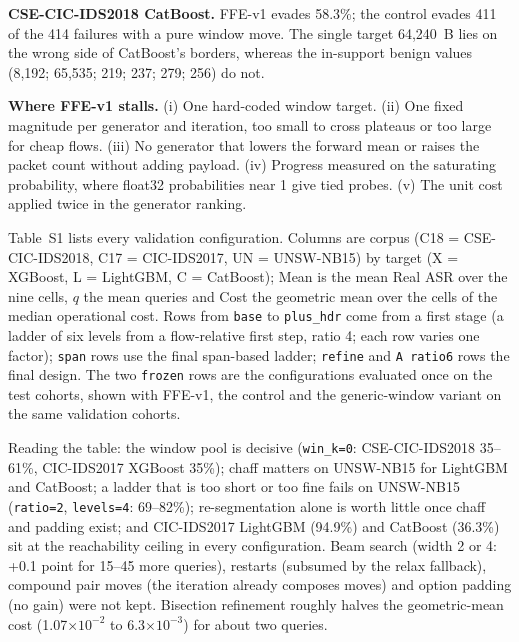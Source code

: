 \textbf{CSE-CIC-IDS2018 CatBoost.} FFE-v1 evades 58.3\%; the control evades 411 of the 414 failures with a pure window move. The single target 64,240~B lies on the wrong side of CatBoost's borders, whereas the in-support benign values (8,192; 65,535; 219; 237; 279; 256) do not.

\textbf{Where FFE-v1 stalls.} (i) One hard-coded window target. (ii) One fixed magnitude per generator and iteration, too small to cross plateaus or too large for cheap flows. (iii) No generator that lowers the forward mean or raises the packet count without adding payload. (iv) Progress measured on the saturating probability, where float32 probabilities near 1 give tied probes. (v) The unit cost applied twice in the generator ranking.

Table~S1 lists every validation configuration. Columns are corpus (C18 = CSE-CIC-IDS2018, C17 = CIC-IDS2017, UN = UNSW-NB15) by target (X = XGBoost, L = LightGBM, C = CatBoost); Mean is the mean Real ASR over the nine cells, $q$ the mean queries and Cost the geometric mean over the cells of the median operational cost. Rows from \texttt{base} to \texttt{plus\_hdr} come from a first stage (a ladder of six levels from a flow-relative first step, ratio 4; each row varies one factor); \texttt{span} rows use the final span-based ladder; \texttt{refine} and \texttt{A ratio6} rows the final design. The two \texttt{frozen} rows are the configurations evaluated once on the test cohorts, shown with FFE-v1, the control and the generic-window variant on the same validation cohorts.

\begin{table}[!htbp]
\centering
\caption*{Table S1. Validation-split tuning of FFE-v2 (Real ASR \%, nine cells).}
\scriptsize
\setlength{\tabcolsep}{2.5pt}
\resizebox{\textwidth}{!}{%
%
}
\end{table}

Reading the table: the window pool is decisive (\texttt{win\_k=0}: CSE-CIC-IDS2018 35--61\%, CIC-IDS2017 XGBoost 35\%); chaff matters on UNSW-NB15 for LightGBM and CatBoost; a ladder that is too short or too fine fails on UNSW-NB15 (\texttt{ratio=2}, \texttt{levels=4}: 69--82\%); re-segmentation alone is worth little once chaff and padding exist; and CIC-IDS2017 LightGBM (94.9\%) and CatBoost (36.3\%) sit at the reachability ceiling in every configuration. Beam search (width 2 or 4: +0.1 point for 15--45 more queries), restarts (subsumed by the relax fallback), compound pair moves (the iteration already composes moves) and option padding (no gain) were not kept. Bisection refinement roughly halves the geometric-mean cost (1.07$\times10^{-2}$ to 6.3$\times10^{-3}$) for about two queries.

